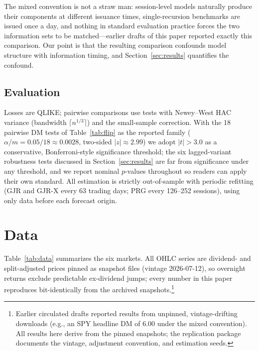 \documentclass[11pt,a4paper]{article}
\begin{document}
The mixed convention is not a straw man: session-level models naturally produce their components at different issuance times, single-recursion benchmarks are issued once a day, and nothing in standard evaluation practice forces the two information sets to be matched---earlier drafts of this paper reported exactly this comparison. Our point is that the resulting comparison confounds model structure with information timing, and Section~\ref{sec:results} quantifies the confound.

\subsection{Evaluation}
\label{sec:eval}

Losses are QLIKE; pairwise comparisons use \citet{Diebold1995} tests with Newey--West HAC variance (bandwidth $\lceil n^{1/3}\rceil$) and the \citet{Harvey1997} small-sample correction. With the 18 pairwise DM tests of Table~\ref{tab:flip} as the reported family ($\alpha/m = 0.05/18 \approx 0.0028$, two-sided $|z| \approx 2.99$) we adopt $|t|>3.0$ as a conservative, Bonferroni-style significance threshold; the six lagged-variant robustness tests discussed in Section~\ref{sec:results} are far from significance under any threshold, and we report nominal $p$-values throughout so readers can apply their own standard. All estimation is strictly out-of-sample with periodic refitting (GJR and GJR-X every 63 trading days; PRG every 126--252 sessions), using only data before each forecast origin.

\section{Data}

Table~\ref{tab:data} summarizes the six markets. All OHLC series are dividend- and split-adjusted prices pinned as snapshot files (vintage 2026-07-12), so overnight returns exclude predictable ex-dividend jumps; every number in this paper reproduces bit-identically from the archived snapshots.\footnote{Earlier circulated drafts reported results from unpinned, vintage-drifting downloads (e.g., an SPY headline DM of 6.00 under the mixed convention). All results here derive from the pinned snapshots; the replication package documents the vintage, adjustment convention, and estimation seeds.}
\end{document}
